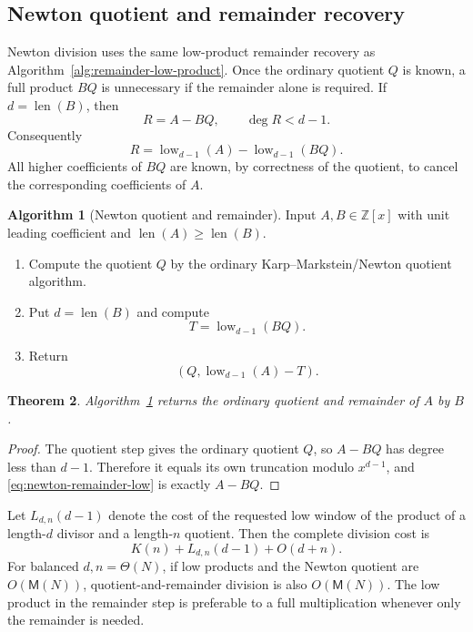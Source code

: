 \documentclass[11pt]{book}
\newtheorem{theorem}{Theorem}[section]
\theoremstyle{definition}
\newtheorem{algorithm}[theorem]{Algorithm}
\newcommand{\ZZ}{\mathbb Z}
\newcommand{\len}{\operatorname{len}}
\begin{document}
\subsection{Newton quotient and remainder recovery}

Newton division uses the same low-product remainder recovery as
Algorithm~\ref{alg:remainder-low-product}.  Once the ordinary quotient $Q$ is
known, a full product $BQ$ is unnecessary if the remainder alone is required.  If $d=\len(B)$, then
\[
 R=A-BQ,
 \qquad \deg R<d-1.
\]
Consequently
\begin{equation}\label{eq:newton-remainder-low}
 R
 =\operatorname{low}_{d-1}(A)
  -\operatorname{low}_{d-1}(BQ).
\end{equation}
All higher coefficients of $BQ$ are known, by correctness of the quotient, to
cancel the corresponding coefficients of $A$.

\begin{algorithm}[Newton quotient and remainder]\label{alg:newton-divrem}
Input $A,B\in\ZZ[x]$ with unit leading coefficient and $\len(A)\geq\len(B)$.
\begin{enumerate}
 \item Compute the quotient $Q$ by the ordinary Karp--Markstein/Newton
 quotient algorithm.
 \item Put $d=\len(B)$ and compute
 \[
   T=\operatorname{low}_{d-1}(BQ).
 \]
 \item Return
 \[
   \left(Q,\operatorname{low}_{d-1}(A)-T\right).
 \]
\end{enumerate}
\end{algorithm}

\begin{theorem}\label{thm:newton-divrem-correctness}
Algorithm~\ref{alg:newton-divrem} returns the ordinary quotient and remainder
of $A$ by $B$.
\end{theorem}

\begin{proof}
The quotient step gives the ordinary quotient $Q$, so $A-BQ$ has degree less
than $d-1$.  Therefore it equals its own truncation modulo $x^{d-1}$, and
\eqref{eq:newton-remainder-low} is exactly $A-BQ$.
\end{proof}

Let $L_{d,n}(d-1)$ denote the cost of the requested low window of the product
of a length-$d$ divisor and a length-$n$ quotient.  Then the complete division
cost is
\begin{equation}\label{eq:newton-divrem-complexity}
 K(n)+L_{d,n}(d-1)+O(d+n).
\end{equation}
For balanced $d,n=\Theta(N)$, if low products and the Newton quotient are
$O(\mathsf M(N))$, quotient-and-remainder division is also
$O(\mathsf M(N))$.  The low product in the remainder step is preferable to a
full multiplication whenever only the remainder is needed.
\end{document}
